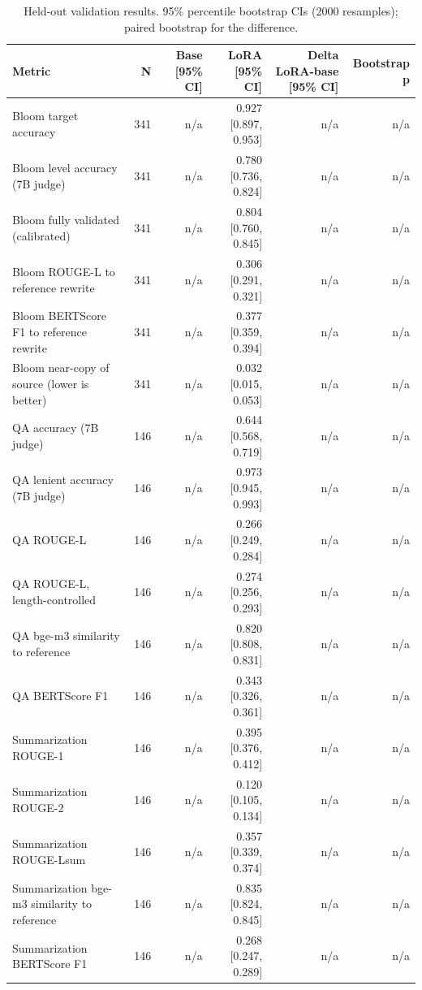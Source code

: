 \begin{table}[t]
\centering
\caption{Held-out validation results. 95\% percentile bootstrap CIs (2000 resamples); paired bootstrap for the difference.}
\label{tab:t3_main_results}
\begin{tabular}{lrrrrr}
\toprule
Metric & N & Base [95\% CI] & LoRA [95\% CI] & Delta LoRA-base [95\% CI] & Bootstrap p \\
\midrule
Bloom target accuracy & 341 & n/a & 0.927 [0.897, 0.953] & n/a & n/a \\
Bloom level accuracy (7B judge) & 341 & n/a & 0.780 [0.736, 0.824] & n/a & n/a \\
Bloom fully validated (calibrated) & 341 & n/a & 0.804 [0.760, 0.845] & n/a & n/a \\
Bloom ROUGE-L to reference rewrite & 341 & n/a & 0.306 [0.291, 0.321] & n/a & n/a \\
Bloom BERTScore F1 to reference rewrite & 341 & n/a & 0.377 [0.359, 0.394] & n/a & n/a \\
Bloom near-copy of source (lower is better) & 341 & n/a & 0.032 [0.015, 0.053] & n/a & n/a \\
QA accuracy (7B judge) & 146 & n/a & 0.644 [0.568, 0.719] & n/a & n/a \\
QA lenient accuracy (7B judge) & 146 & n/a & 0.973 [0.945, 0.993] & n/a & n/a \\
QA ROUGE-L & 146 & n/a & 0.266 [0.249, 0.284] & n/a & n/a \\
QA ROUGE-L, length-controlled & 146 & n/a & 0.274 [0.256, 0.293] & n/a & n/a \\
QA bge-m3 similarity to reference & 146 & n/a & 0.820 [0.808, 0.831] & n/a & n/a \\
QA BERTScore F1 & 146 & n/a & 0.343 [0.326, 0.361] & n/a & n/a \\
Summarization ROUGE-1 & 146 & n/a & 0.395 [0.376, 0.412] & n/a & n/a \\
Summarization ROUGE-2 & 146 & n/a & 0.120 [0.105, 0.134] & n/a & n/a \\
Summarization ROUGE-Lsum & 146 & n/a & 0.357 [0.339, 0.374] & n/a & n/a \\
Summarization bge-m3 similarity to reference & 146 & n/a & 0.835 [0.824, 0.845] & n/a & n/a \\
Summarization BERTScore F1 & 146 & n/a & 0.268 [0.247, 0.289] & n/a & n/a \\
\bottomrule
\end{tabular}
\end{table}
